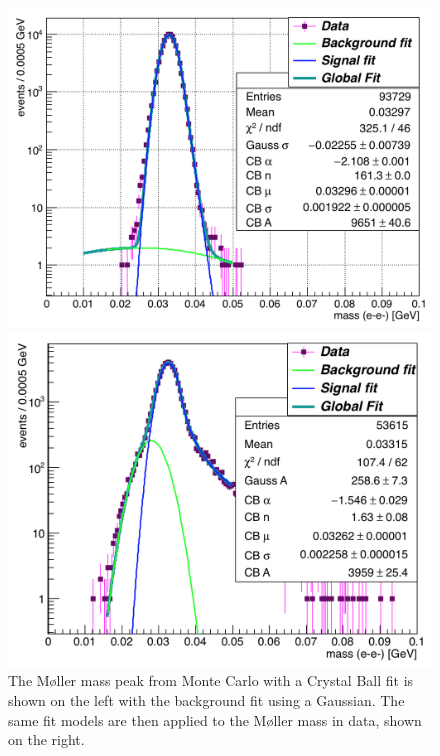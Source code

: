 \begin{figure}[hbt]
\begin{minipage}{0.45\textwidth}
\includegraphics[width=\textwidth]{pics/searching/mollerMassMC.png}
\end{minipage}\hfill\begin{minipage}{0.45\textwidth}
 \includegraphics[width=\textwidth]{pics/searching/mollerMass.png}
 \end{minipage}
 \caption[Fit to the M\o ller mass peak in Monte Carlo and data]{The M\o ller mass peak from Monte Carlo with a Crystal Ball fit is shown on the left with the background fit using a Gaussian. The same fit models are then applied to the M\o ller mass in data, shown on the right.}
  \label{fig:moller}
\end{figure}
